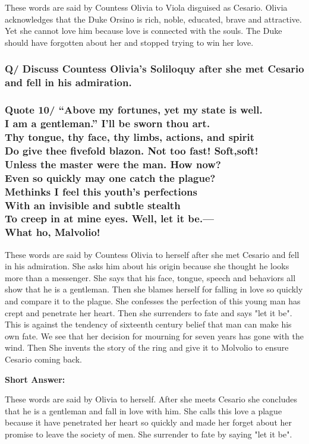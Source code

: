 \documentclass[12pt, a4paper]{article}
\begin{document}
These words are said by Countess Olivia to Viola disguised as Cesario.
Olivia acknowledges that the Duke Orsino is rich, noble, educated, brave 
and attractive. Yet she cannot love him because love is connected with
the souls. The Duke should have forgotten about her and stopped trying 
to win her love.

\subsubsection*{Q/ Discuss Countess Olivia's Soliloquy after she met
Cesario and fell in his admiration.}

\subsubsection*{Quote 10/
“Above my fortunes, yet my state is well.\\
I am a gentleman.” I’ll be sworn thou art.\\
Thy tongue, thy face, thy limbs, actions, and spirit\\
Do give thee fivefold blazon. Not too fast! Soft,soft!\\
Unless the master were the man. How now?\\
Even so quickly may one catch the plague?\\
Methinks I feel this youth’s perfections\\
With an invisible and subtle stealth\\
To creep in at mine eyes. Well, let it be.—\\
What ho, Malvolio!
}

These words are said by Countess Olivia to herself after she met Cesario
and fell in his admiration. She asks him about his origin because she
thought he looks more than a messenger. She says that his face, tongue, 
speech and behaviors all show that he is a gentleman. Then she blames
herself for falling in love so quickly and compare it to the plague. 
She confesses the perfection of this young man has crept and penetrate
her heart. Then she surrenders to fate and says "let it be". This is
against the tendency of sixteenth century belief that man can make his own
fate. We see that her decision for mourning for seven years has gone
with the wind. Then She invents the story of the ring and give it to 
Molvolio to ensure Cesario coming back.\medbreak

\textbf{Short Answer:}\smallbreak

These words are said by Olivia to herself. After she meets Cesario
she concludes that he is a gentleman and fall in love with him.
She calls this love a plague because it have penetrated her heart so quickly
and made her forget about her promise to leave the society of men. She 
surrender to fate by saying "let it be".
\end{document}
